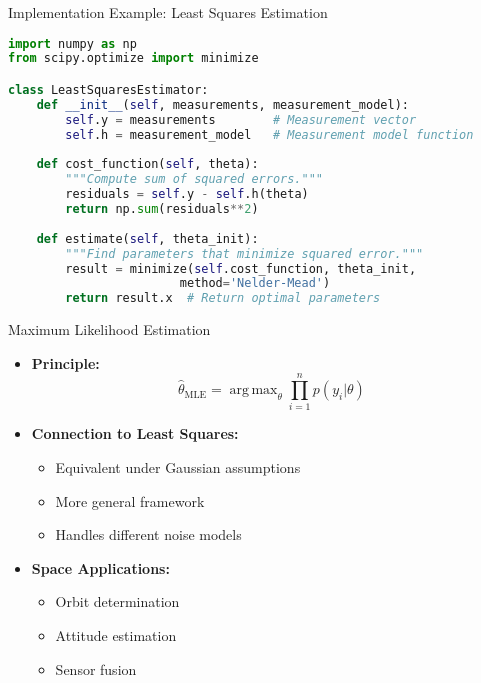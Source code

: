 \documentclass[aspectratio=169]{beamer}
\DeclareMathOperator*{\argmax}{arg\,max}
\begin{document}
\begin{frame}[fragile]{Implementation Example: Least Squares Estimation}
\begin{lstlisting}[language=Python]
import numpy as np
from scipy.optimize import minimize

class LeastSquaresEstimator:
    def __init__(self, measurements, measurement_model):
        self.y = measurements        # Measurement vector
        self.h = measurement_model   # Measurement model function
        
    def cost_function(self, theta):
        """Compute sum of squared errors."""
        residuals = self.y - self.h(theta)
        return np.sum(residuals**2)
    
    def estimate(self, theta_init):
        """Find parameters that minimize squared error."""
        result = minimize(self.cost_function, theta_init, 
                        method='Nelder-Mead')
        return result.x  # Return optimal parameters
\end{lstlisting}
\end{frame}

\begin{frame}{Maximum Likelihood Estimation}
    \begin{itemize}
        \item<1-> \textbf{Principle:}
            \[ \hat{\theta}_{\text{MLE}} = \argmax_{\theta} \prod_{i=1}^n p(y_i|\theta) \]
        \item<2-> \textbf{Connection to Least Squares:}
            \begin{itemize}
                \item Equivalent under Gaussian assumptions
                \item More general framework
                \item Handles different noise models
            \end{itemize}
        \item<3-> \textbf{Space Applications:}
            \begin{itemize}
                \item Orbit determination
                \item Attitude estimation
                \item Sensor fusion
            \end{itemize}
    \end{itemize}
\end{frame}
\end{document}
